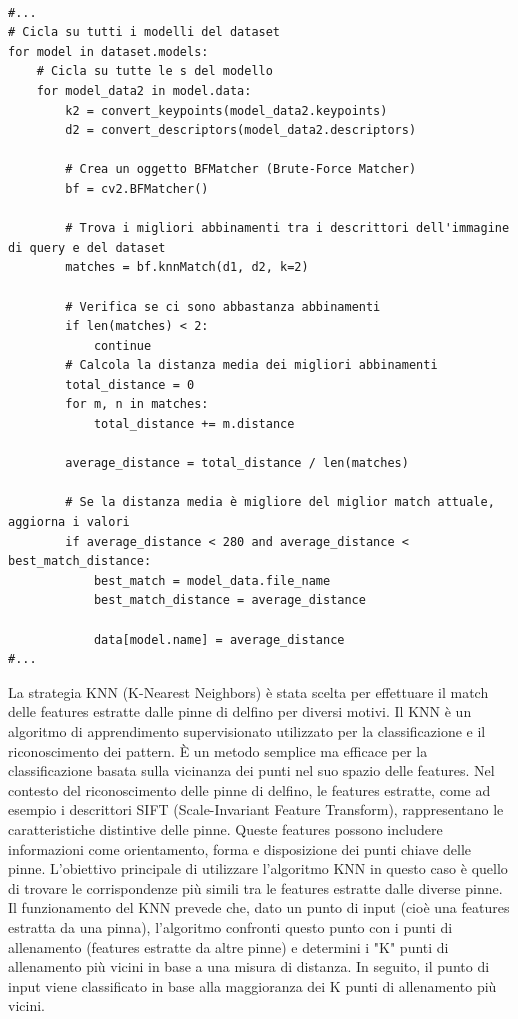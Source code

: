\documentclass[a4paper,12pt]{report}
\begin{document}
\newpage
      \begin{lstlisting}

#...
# Cicla su tutti i modelli del dataset
for model in dataset.models:
    # Cicla su tutte le s del modello
    for model_data2 in model.data:
        k2 = convert_keypoints(model_data2.keypoints)
        d2 = convert_descriptors(model_data2.descriptors)

        # Crea un oggetto BFMatcher (Brute-Force Matcher)
        bf = cv2.BFMatcher()

        # Trova i migliori abbinamenti tra i descrittori dell'immagine di query e del dataset
        matches = bf.knnMatch(d1, d2, k=2)

        # Verifica se ci sono abbastanza abbinamenti
        if len(matches) < 2:
            continue
        # Calcola la distanza media dei migliori abbinamenti
        total_distance = 0
        for m, n in matches:
            total_distance += m.distance
        
        average_distance = total_distance / len(matches)

        # Se la distanza media è migliore del miglior match attuale, aggiorna i valori
        if average_distance < 280 and average_distance < best_match_distance:
            best_match = model_data.file_name
            best_match_distance = average_distance

            data[model.name] = average_distance
#...
      \end{lstlisting}
      La strategia KNN (K-Nearest Neighbors) è stata scelta per effettuare il match delle features estratte dalle pinne di delfino per diversi motivi. Il KNN è un algoritmo di apprendimento supervisionato utilizzato per la classificazione e il riconoscimento dei pattern. 
      \newpage
      È un metodo semplice ma efficace per la classificazione basata sulla vicinanza dei punti nel suo spazio delle features.
      Nel contesto del riconoscimento delle pinne di delfino, le features estratte, come ad esempio i descrittori SIFT (Scale-Invariant Feature Transform), rappresentano le caratteristiche distintive delle pinne. Queste features possono includere informazioni come orientamento, forma e disposizione dei punti chiave delle pinne.
      L'obiettivo principale di utilizzare l'algoritmo KNN in questo caso è quello di trovare le corrispondenze più simili tra le features estratte dalle diverse pinne. Il funzionamento del KNN prevede che, dato un punto di input (cioè una features estratta da una pinna), l'algoritmo confronti questo punto con i punti di allenamento (features estratte da altre pinne) e determini i "K" punti di allenamento più vicini in base a una misura di distanza. In seguito, il punto di input viene classificato in base alla maggioranza dei K punti di allenamento più vicini.
\end{document}

